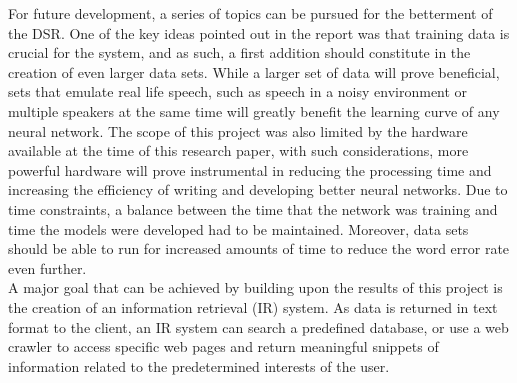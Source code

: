 For future development, a series of topics can be pursued for the 
betterment of the DSR.
 One of the key ideas pointed out in the report was that training data is 
 crucial for the system, and as such, a first addition should constitute in the creation of even larger data sets. 
 While a larger set of data will prove beneficial, sets that emulate real 
 life speech, such as speech in a noisy environment or multiple speakers 
 at the same time will greatly benefit the learning curve of any neural 
 network. The scope of this project was also limited by the hardware available 
 at the time of this research paper, with such considerations, more 
 powerful hardware will prove instrumental in reducing the processing time 
 and increasing the efficiency of writing and developing better neural 
 networks. Due to time constraints, a balance between the time that the 
 network was training and time the models were developed had to be 
 maintained. Moreover, data sets should be able to run 
 for increased amounts of time to reduce the word error rate even further. \\
 
 A major goal that can be achieved by building upon the results of this project is the creation of an information retrieval (IR) system. 
 As data is returned in text format to the client, an IR system can search 
 a predefined database, or use a web crawler to access specific web pages 
 and return meaningful snippets of information related to the predetermined interests of the user.
